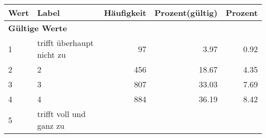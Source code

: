      \begin{longtable}{lXrrr}
     \toprule
     \textbf{Wert} & \textbf{Label} & \textbf{Häufigkeit} & \textbf{Prozent(gültig)} & \textbf{Prozent} \\
     \endhead
     \midrule
     \multicolumn{5}{l}{\textbf{Gültige Werte}}\\

     1 &
     \multicolumn{1}{X}{ trifft überhaupt nicht zu   } &


       \num{97} &
       \num[round-mode=places,round-precision=2]{3.97} &
         \num[round-mode=places,round-precision=2]{0.92} \\

     2 &
     \multicolumn{1}{X}{ 2   } &


       \num{456} &
       \num[round-mode=places,round-precision=2]{18.67} &
         \num[round-mode=places,round-precision=2]{4.35} \\

     3 &
     \multicolumn{1}{X}{ 3   } &


       \num{807} &
       \num[round-mode=places,round-precision=2]{33.03} &
         \num[round-mode=places,round-precision=2]{7.69} \\

     4 &
     \multicolumn{1}{X}{ 4   } &


       \num{884} &
       \num[round-mode=places,round-precision=2]{36.19} &
         \num[round-mode=places,round-precision=2]{8.42} \\

     5 &
     \multicolumn{1}{X}{ trifft voll und ganz zu   } &



\end{longtable}
